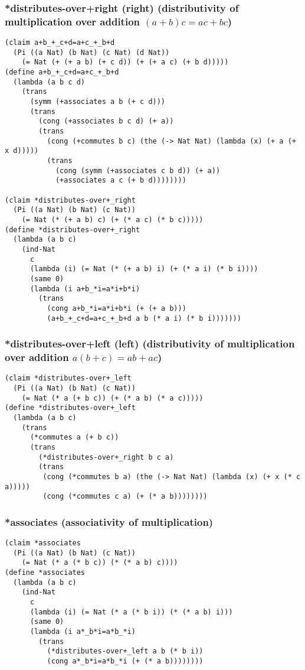 \subsubsection{*distributes-over+right (right) (distributivity of multiplication over addition \((a + b)c = ac + bc\))} \label{code:*distributes-over+right}
\begin{verbatim}
(claim a+b_+_c+d=a+c_+_b+d
  (Pi ((a Nat) (b Nat) (c Nat) (d Nat))
    (= Nat (+ (+ a b) (+ c d)) (+ (+ a c) (+ b d)))))
(define a+b_+_c+d=a+c_+_b+d
  (lambda (a b c d)
    (trans
      (symm (+associates a b (+ c d)))
      (trans
        (cong (+associates b c d) (+ a))
        (trans
          (cong (+commutes b c) (the (-> Nat Nat) (lambda (x) (+ a (+ x d)))))
          (trans
            (cong (symm (+associates c b d)) (+ a))
            (+associates a c (+ b d))))))))

(claim *distributes-over+_right
  (Pi ((a Nat) (b Nat) (c Nat))
    (= Nat (* (+ a b) c) (+ (* a c) (* b c)))))
(define *distributes-over+_right
  (lambda (a b c)
    (ind-Nat
      c
      (lambda (i) (= Nat (* (+ a b) i) (+ (* a i) (* b i))))
      (same 0)
      (lambda (i a+b_*i=a*i+b*i)
        (trans
          (cong a+b_*i=a*i+b*i (+ (+ a b)))
          (a+b_+_c+d=a+c_+_b+d a b (* a i) (* b i)))))))
\end{verbatim}

\subsubsection{*distributes-over+left (left) (distributivity of multiplication over addition \(a(b + c) = ab + ac\))} \label{code:*distributes-over+left}
\begin{verbatim}
(claim *distributes-over+_left
  (Pi ((a Nat) (b Nat) (c Nat))
    (= Nat (* a (+ b c)) (+ (* a b) (* a c)))))
(define *distributes-over+_left
  (lambda (a b c)
    (trans
      (*commutes a (+ b c))
      (trans
        (*distributes-over+_right b c a)
        (trans
         (cong (*commutes b a) (the (-> Nat Nat) (lambda (x) (+ x (* c a)))))
         (cong (*commutes c a) (+ (* a b))))))))
\end{verbatim}

\subsubsection{*associates (associativity of multiplication)} \label{code:*associates}
\begin{verbatim}
(claim *associates
  (Pi ((a Nat) (b Nat) (c Nat))
    (= Nat (* a (* b c)) (* (* a b) c))))
(define *associates
  (lambda (a b c)
    (ind-Nat
      c
      (lambda (i) (= Nat (* a (* b i)) (* (* a b) i)))
      (same 0)
      (lambda (i a*_b*i=a*b_*i)
        (trans
          (*distributes-over+_left a b (* b i))
          (cong a*_b*i=a*b_*i (+ (* a b))))))))
\end{verbatim}


